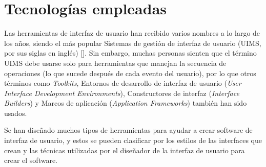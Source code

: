 \section{Tecnologías empleadas}

Las herramientas de interfaz de usuario han recibido varios nombres a lo largo de los años, siendo el más popular Sistemas de gestión de interfaz de usuario (UIMS, por sus siglas en inglés) [\cite{31}]. Sin embargo, muchas personas sienten que el término UIMS debe usarse solo para herramientas que manejan la secuencia de operaciones (lo que sucede después de cada evento del usuario), por lo que otros términos como \textit{Toolkits}, Entornos de desarrollo de interfaz de usuario (\textit{User Interface Development Environments}), Constructores de interfaz (\textit{Interface Builders}) y Marcos de aplicación (\textit{Application Frameworks}) también han sido usados.

Se han diseñado muchos tipos de herramientas para ayudar a crear software de interfaz de usuario, y estos se pueden clasificar por los estilos de las interfaces que crean y las técnicas utilizadas por el diseñador de la interfaz de usuario para crear el software.



